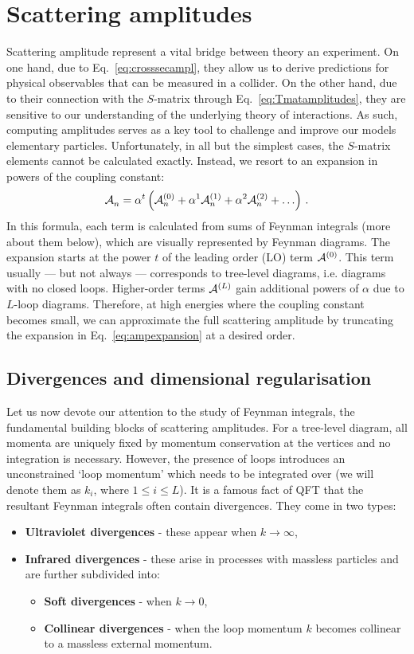 \documentclass[main.tex]{subfiles}
\begin{document}
\section{Scattering amplitudes}
Scattering amplitude represent a vital bridge between theory an experiment. On one hand, due to Eq.~\ref{eq:crosssecampl}, they allow us to derive predictions for physical observables that can be measured in a collider. On the other hand, due to their connection with the $S$-matrix through Eq.~\ref{eq:Tmatamplitudes}, they are sensitive to our understanding of the underlying theory of interactions. As such, computing amplitudes serves as a key tool to challenge and improve our models elementary particles. Unfortunately, in all but the simplest cases, the $S$-matrix elements cannot be calculated exactly. Instead, we resort to an expansion in powers of the coupling constant:
\begin{equation} \label{eq:ampexpansion}
    \mathcal{A}_{n}^{} = \alpha^t \left(\mathcal{A}_{n}^{(0)} + \alpha^1 \mathcal{A}_{n}^{(1)} + \alpha^2 \mathcal{A}_{n}^{(2)} + \ldots \right) \,.
\end{equation}
In this formula, each term is calculated from sums of Feynman integrals (more about them below), which are visually represented by Feynman diagrams. The expansion starts at the power $t$ of the leading order (LO) term $\mathcal{A}_{}^{(0)}$. This term usually --- but not always --- corresponds to tree-level diagrams, i.e. diagrams with no closed loops. Higher-order terms $\mathcal{A}_{}^{(L)}$ gain additional powers of $\alpha$ due to $L$-loop diagrams. Therefore, at high energies where the coupling constant becomes small, we can approximate the full scattering amplitude by truncating the expansion in Eq.~\ref{eq:ampexpansion} at a desired order.

\subsection{Divergences and dimensional regularisation} \label{sec:divergences}
Let us now devote our attention to the study of Feynman integrals, the fundamental building blocks of scattering amplitudes. For a tree-level diagram, all momenta are uniquely fixed by momentum conservation at the vertices and no integration is necessary. However, the presence of loops introduces an unconstrained `loop momentum' which needs to be integrated over (we will denote them as $k_i$, where $1\le i\le L$). It is a famous fact of QFT that the resultant Feynman integrals often contain divergences. They come in two types: 
\begin{itemize}
    \item \textbf{Ultraviolet divergences} - these appear when $k \rightarrow \infty$,
\item \textbf{Infrared divergences} - these arise in processes with massless particles and are further subdivided into:
\begin{itemize}
    \item \textbf{Soft divergences} - when $k \rightarrow 0$,
    \item \textbf{Collinear divergences} - when the loop momentum $k$ becomes collinear to a massless external momentum.
\end{itemize}
\end{itemize}
\end{document}
